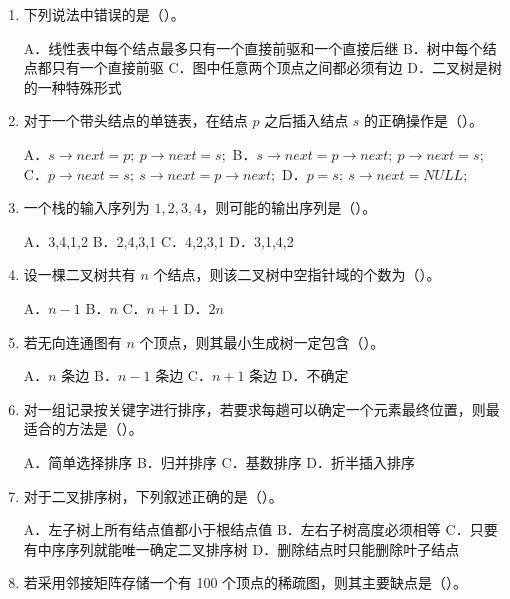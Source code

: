 \documentclass{../../note}
\begin{document}
\begin{enumerate}[itemsep=0.8em]
\item 下列说法中错误的是（\hspace{0.8cm}）。

A．线性表中每个结点最多只有一个直接前驱和一个直接后继
\quad B．树中每个结点都只有一个直接前驱
\quad C．图中任意两个顶点之间都必须有边
\quad D．二叉树是树的一种特殊形式

\item 对于一个带头结点的单链表，在结点 $p$ 之后插入结点 $s$ 的正确操作是（\hspace{0.8cm}）。

A．$s\to next=p;\ p\to next=s;$
\quad B．$s\to next=p\to next;\ p\to next=s;$
\quad C．$p\to next=s;\ s\to next=p\to next;$
\quad D．$p=s;\ s\to next=NULL;$

\item 一个栈的输入序列为 $1,2,3,4$，则可能的输出序列是（\hspace{0.8cm}）。

A．3,4,1,2 \quad B．2,4,3,1 \quad C．4,2,3,1 \quad D．3,1,4,2

\item 设一棵二叉树共有 $n$ 个结点，则该二叉树中空指针域的个数为（\hspace{0.8cm}）。

A．$n-1$ \quad B．$n$ \quad C．$n+1$ \quad D．$2n$

\item 若无向连通图有 $n$ 个顶点，则其最小生成树一定包含（\hspace{0.8cm}）。

A．$n$ 条边 \quad B．$n-1$ 条边 \quad C．$n+1$ 条边 \quad D．不确定

\item 对一组记录按关键字进行排序，若要求每趟可以确定一个元素最终位置，则最适合的方法是（\hspace{0.8cm}）。

A．简单选择排序 \quad B．归并排序 \quad C．基数排序 \quad D．折半插入排序

\item 对于二叉排序树，下列叙述正确的是（\hspace{0.8cm}）。

A．左子树上所有结点值都小于根结点值
\quad B．左右子树高度必须相等
\quad C．只要有中序序列就能唯一确定二叉排序树
\quad D．删除结点时只能删除叶子结点

\item 若采用邻接矩阵存储一个有 100 个顶点的稀疏图，则其主要缺点是（\hspace{0.8cm}）。


\end{enumerate}
\end{document}
